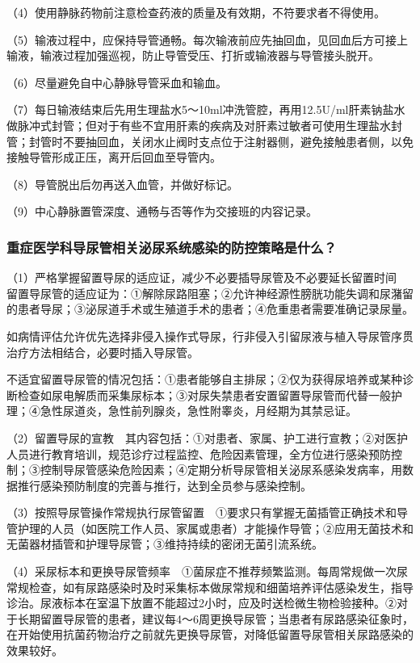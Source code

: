 （4）使用静脉药物前注意检查药液的质量及有效期，不符要求者不得使用。

（5）输液过程中，应保持导管通畅。每次输液前应先抽回血，见回血后方可接上输液，输液过程加强巡视，防止导管受压、打折或输液器与导管接头脱开。

（6）尽量避免自中心静脉导管采血和输血。

（7）每日输液结束后先用生理盐水5～10ml冲洗管腔，再用12.5U/ml肝素钠盐水做脉冲式封管；但对于有些不宜用肝素的疾病及对肝素过敏者可使用生理盐水封管；封管时不要抽回血，关闭水止阀时支点位于注射器侧，避免接触患者侧，以免接触导管形成正压，离开后回血至导管内。

（8）导管脱出后勿再送入血管，并做好标记。

（9）中心静脉置管深度、通畅与否等作为交接班的内容记录。

\subsubsection{重症医学科导尿管相关泌尿系统感染的防控策略是什么？}

（1）严格掌握留置导尿的适应证，减少不必要插导尿管及不必要延长留置时间　留置导尿管的适应证为：①解除尿路阻塞；②允许神经源性膀胱功能失调和尿潴留的患者导尿；③泌尿道手术或生殖道手术的患者；④危重患者需要准确记录尿量。

如病情评估允许优先选择非侵入操作式导尿，行非侵入引留尿液与植入导尿管序贯治疗方法相结合，必要时插入导尿管。

不适宜留置导尿管的情况包括：①患者能够自主排尿；②仅为获得尿培养或某种诊断检查如尿电解质而采集尿标本；③对尿失禁患者安置留置导尿管而代替一般护理；④急性尿道炎，急性前列腺炎，急性附睾炎，月经期为其禁忌证。

（2）留置导尿的宣教　其内容包括：①对患者、家属、护工进行宣教；②对医护人员进行教育培训，规范诊疗过程监控、危险因素管理，全方位进行感染预防控制；③控制导尿管感染危险因素；④定期分析导尿管相关泌尿系感染发病率，用数据推行感染预防制度的完善与推行，达到全员参与感染控制。

（3）按照导尿管操作常规执行尿管留置　①要求只有掌握无菌插管正确技术和导管护理的人员（如医院工作人员、家属或患者）才能操作导管；②应用无菌技术和无菌器材插管和护理导尿管；③维持持续的密闭无菌引流系统。

（4）采尿标本和更换导尿管频率　①菌尿症不推荐频繁监测。每周常规做一次尿常规检查，如有尿路感染时及时采集标本做尿常规和细菌培养评估感染发生，指导诊治。尿液标本在室温下放置不能超过2小时，应及时送检微生物检验接种。②对于长期留置导尿管的患者，建议每4～6周更换导尿管；当患者有尿路感染征象时，在开始使用抗菌药物治疗之前就先更换导尿管，对降低留置导尿管相关尿路感染的效果较好。

